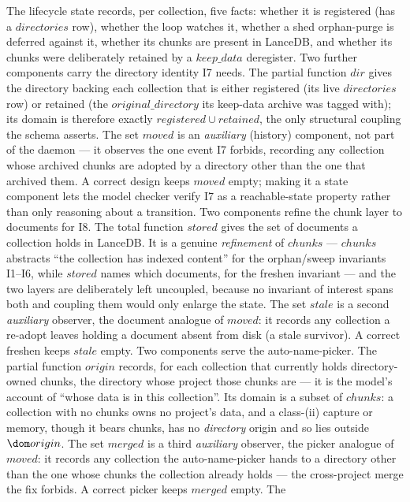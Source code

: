 \documentclass[a4paper]{article}
\begin{document}
The lifecycle state records, per collection, five facts: whether it is
registered (has a $directories$ row), whether the loop watches it, whether a
shed orphan-purge is deferred against it, whether its chunks are present in
LanceDB, and whether its chunks were deliberately retained by a
$keep\_data$ deregister.  Two further components carry the directory identity
I7 needs.  The partial function $dir$ gives the directory backing each
collection that is either registered (its live $directories$ row) or retained
(the $original\_directory$ its keep-data archive was tagged with); its domain is
therefore exactly $registered \cup retained$, the only structural coupling the
schema asserts.  The set $moved$ is an \textit{auxiliary} (history) component,
not part of the daemon --- it observes the one event I7 forbids, recording any
collection whose archived chunks are adopted by a directory other than the one
that archived them.  A correct design keeps $moved$ empty; making it a state
component lets the model checker verify I7 as a reachable-state property rather
than only reasoning about a transition.  Two components refine the chunk layer
to documents for I8.  The total function $stored$ gives the set of documents a
collection holds in LanceDB.  It is a genuine \textit{refinement} of $chunks$
--- $chunks$ abstracts ``the collection has indexed content'' for the
orphan/sweep invariants I1--I6, while $stored$ names which documents, for the
freshen invariant --- and the two layers are deliberately left uncoupled,
because no invariant of interest spans both and coupling them would only enlarge
the state.  The set $stale$ is a second \textit{auxiliary} observer, the
document analogue of $moved$: it records any collection a re-adopt leaves holding
a document absent from disk (a stale survivor).  A correct freshen keeps $stale$
empty.  Two components serve the auto-name-picker.  The partial function $origin$
records, for each collection that currently holds directory-owned chunks, the
directory whose project those chunks are --- it is the model's account of ``whose
data is in this collection''.  Its domain is a subset of $chunks$: a collection
with no chunks owns no project's data, and a class-(ii) capture or memory, though
it bears chunks, has no \textit{directory} origin and so lies outside $\dom
origin$.  The set $merged$ is a third \textit{auxiliary} observer, the picker
analogue of $moved$: it records any collection the auto-name-picker hands to a
directory other than the one whose chunks the collection already holds --- the
cross-project merge the fix forbids.  A correct picker keeps $merged$ empty.  The
\end{document}
